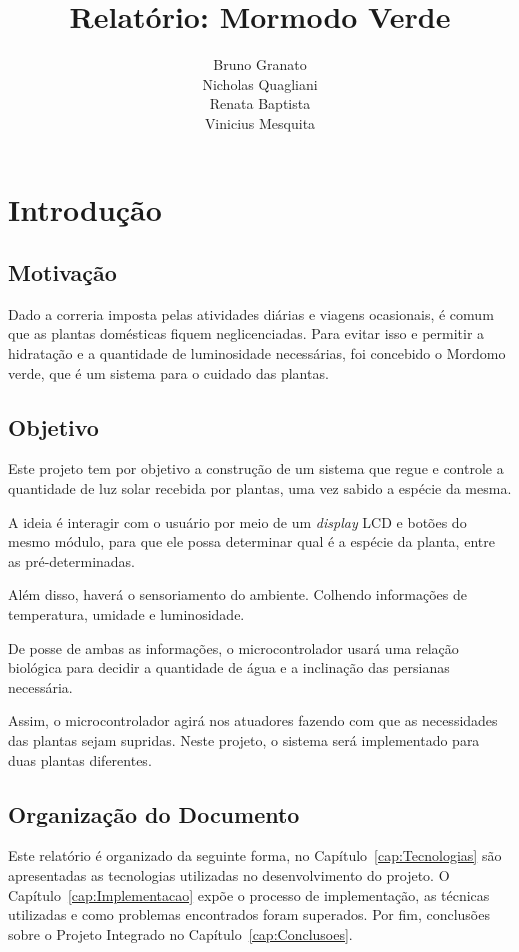 \documentclass[a4paper,12pt]{report}
\title{ Relatório: Mormodo Verde }
\author{Bruno Granato \\
	Nicholas Quagliani\\
	Renata Baptista\\
	Vinicius Mesquita}
\begin{document}
\maketitle


\tableofcontents
\chapter{Introdução}
	\section{Motivação}
		Dado a correria imposta pelas atividades diárias e viagens ocasionais, é comum que as plantas domésticas fiquem neglicenciadas. Para evitar isso e permitir a hidratação e a quantidade de luminosidade necessárias, foi concebido o Mordomo verde, que é um sistema para o cuidado das plantas.
	\section{Objetivo}
		Este projeto tem por objetivo a construção de um sistema que regue e controle a quantidade de luz solar recebida por plantas, uma vez sabido a espécie da mesma.
		
		A ideia é interagir com o usuário por meio de um \textit{display} LCD e botões do mesmo módulo, para que ele possa determinar qual é a espécie da planta, entre as pré-determinadas. 
		
		Além disso, haverá o sensoriamento do ambiente. Colhendo informações de temperatura, umidade e luminosidade.
		
		De posse de ambas as informações, o microcontrolador usará uma relação biológica para decidir a quantidade de água e a inclinação das persianas necessária. 
		
		Assim, o microcontrolador agirá nos atuadores fazendo com que as necessidades das plantas sejam supridas. Neste projeto, o sistema será implementado para duas plantas diferentes.
	\section{Organização do Documento}
	    Este relatório é organizado da seguinte forma, no Capítulo~\ref{cap:Tecnologias} são apresentadas as tecnologias utilizadas no desenvolvimento do projeto. O Capítulo~\ref{cap:Implementacao} expõe o processo de implementação, as técnicas utilizadas e como problemas encontrados foram superados. Por fim, conclusões sobre o Projeto Integrado no Capítulo~\ref{cap:Conclusoes}.
\end{document}
